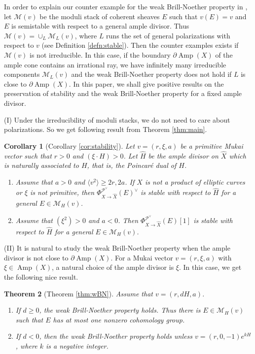 \documentclass[10pt]{amsart}
\def\cal{\mathcal}
\newcommand{\Amp}{\operatorname{Amp}}
\numberwithin{equation}{section}
\theoremstyle{plain}
\newtheorem{thm}{Theorem}[section]
\newtheorem{cor}[thm]{Corollary}
\theoremstyle{definition}
\theoremstyle{remark}
\begin{document}
In order to explain our counter example for the weak Brill-Noether property in \cite{CNY2},
let ${\cal M}(v)$ be the moduli stack of coherent sheaves $E$
such that $v(E)=v$ and $E$ is semistable with respect to a general ample divisor.
Thus ${\cal M}(v)=\cup_L {\cal M}_L(v)$, where $L$ runs the set of general polarizations with respect to $v$
(see Definition \ref{defn:stable}).
Then the counter examples exists if ${\cal M}(v)$ is not irreducible.
In this case, if the boundary $\partial \! \Amp(X)$ of the ample cone contains an irrational ray,
we have infinitely many irreducible components ${\cal M}_L(v)$
and the weak Brill-Noether property does not hold if $L$ is close to $\partial \! \Amp(X)$.
In this paper, we shall give positive results on the preservation of stability
and the weak Brill-Noether property for a fixed ample divisor.

(I) Under the irreducibility of moduli stacks, we do not need to care about polarizations.
So we get following result from Theorem \ref{thm:main}.
\begin{cor}[{Corollary \ref{cor:stability}}]\label{cor:main}
Let $v=(r,\xi,a)$ be a primitive Mukai vector such that $r>0$ and $(\xi \cdot H)>0$.
Let $\widehat{H}$ be the ample divisor on $\widehat{X}$ which is naturally associated to $H$, that is,
the Poincar\'{e} dual of $H$. 
\begin{enumerate}
\item[(1)]
Assume that $a>0$ and $\langle v^2 \rangle \geq 2r, 2a$.
If $X$ is not a product of elliptic curves or $\xi$ is not primitive, then
$\Phi_{X \to \widehat{X}}^{{\cal P}^{\vee}}(E)^{\vee}$ is stable with respect to $\widehat{H}$ for a general
$E \in {\cal M}_H(v)$.
\item[(2)]
Assume that $(\xi^2)>0$ and $a< 0$.
Then $\Phi_{X \to \widehat{X}}^{{\cal P}^{\vee}}(E)[1]$ is stable with respect to $\widehat{H}$ for a general
$E \in {\cal M}_H(v)$.
\end{enumerate}
\end{cor}





(II)
It is natural to study the weak Brill-Noether property when the ample divisor is not close to 
$\partial \! \Amp(X)$.
For a Mukai vector $v=(r,\xi,a)$ with $\xi \in \Amp(X)$,
a natural choice of the ample divisor is $\xi$.
In this case, we get the following nice result.

 

\begin{thm}[{Theorem \ref{thm:wBN}}]\label{thm:main2}
Assume that $v=(r,dH,a)$.
\begin{enumerate}
\item[(1)] 
If $d \geq 0$,
the weak Brill-Noether property holds.
Thus there is $E \in {\cal M}_H(v)$ such that $E$ has at most one nonzero cohomology
group.
\item[(2)]
If $d<0$, then
the weak Brill-Noether property holds unless $v=(r,0,-1)e^{kH}$, where
$k$ is a negative integer.
\end{enumerate}
\end{thm}
\end{document}
